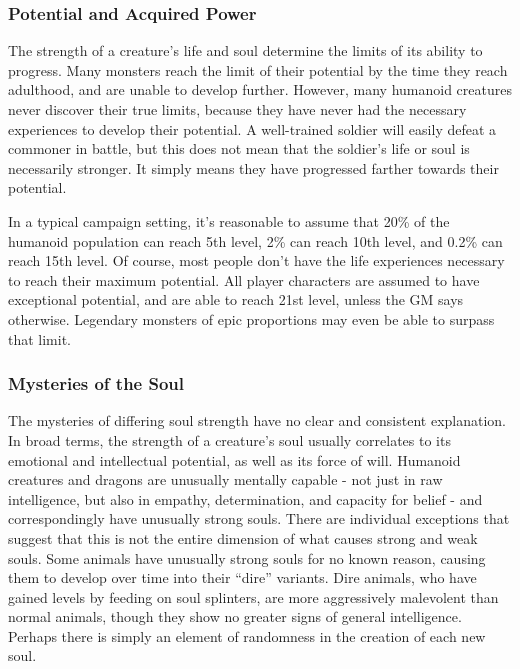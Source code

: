     \subsubsection{Potential and Acquired Power}
      The strength of a creature's life and soul determine the limits of its ability to progress.
      Many monsters reach the limit of their potential by the time they reach adulthood, and are unable to develop further.
      However, many humanoid creatures never discover their true limits, because they have never had the necessary experiences to develop their potential.
      A well-trained soldier will easily defeat a commoner in battle, but this does not mean that the soldier's life or soul is necessarily stronger.
      It simply means they have progressed farther towards their potential.

      In a typical campaign setting, it's reasonable to assume that 20\% of the humanoid population can reach 5th level, 2\% can reach 10th level, and 0.2\% can reach 15th level.
      Of course, most people don't have the life experiences necessary to reach their maximum potential.
      All player characters are assumed to have exceptional potential, and are able to reach 21st level, unless the GM says otherwise.
      Legendary monsters of epic proportions may even be able to surpass that limit.

    \subsubsection{Mysteries of the Soul}
      The mysteries of differing soul strength have no clear and consistent explanation.
      In broad terms, the strength of a creature's soul usually correlates to its emotional and intellectual potential, as well as its force of will.
      Humanoid creatures and dragons are unusually mentally capable - not just in raw intelligence, but also in empathy, determination, and capacity for belief - and correspondingly have unusually strong souls.
      There are individual exceptions that suggest that this is not the entire dimension of what causes strong and weak souls.
      Some animals have unusually strong souls for no known reason, causing them to develop over time into their ``dire'' variants.
      Dire animals, who have gained levels by feeding on soul splinters, are more aggressively malevolent than normal animals, though they show no greater signs of general intelligence.
      Perhaps there is simply an element of randomness in the creation of each new soul.

